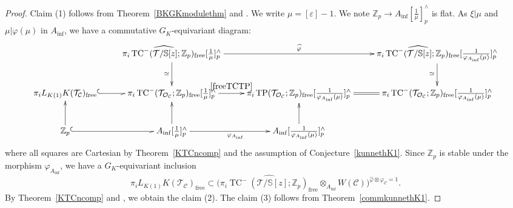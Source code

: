 \documentclass[11pt]{amsart}
\newcommand{\Z}{\mathbb{Z}}
\newcommand{\sO}{\mathcal{O}}
\newcommand{\sT}{\mathcal{T}}
\newcommand{\bS}{\mathbb{S}}
\newcommand{\free}{\operatorname{{free}}}
\newcommand{\LK}{{L_{K(1)}}}
\newcommand{\TP}{\operatorname{TP}}
\newcommand{\TCn}{\operatorname{TC}^{-}}
\renewcommand{\epsilon}{\varepsilon}
\newcommand{\Ainf}{A_{\operatorname{inf}}}
\newcommand{\Cu}{\mathcal{C}}
\theoremstyle{definition}
\theoremstyle{remark}
\numberwithin{equation}{section}
\begin{document}
\begin{proof}
 Claim (1) follows from Theorem~\ref{BKGKmodulethm} and \cite[Theorem 7.1.7]{Gao}. We write $\mu=[\epsilon]-1$. We note $\Z_p \to \Ainf[\frac{1}{\mu}]^{\wedge}_p$ is flat. As $\xi | \mu$ and $\mu|\varphi(\mu)$ in $\Ainf$, we have a commutative $G_K$-equivariant diagram:\footnotesize
 \[
 \xymatrix{
&\widehat{\pi_i\TCn(\sT/\bS[z];\Z_p)_{\free}}[\frac{1}{\mu}]^{\wedge}_p \ar[d]_{\simeq}\ar[rr]^-{\widehat{\varphi}}& &\widehat{\pi_i\TCn(\sT/\bS[z];\Z_p)_{\free}}[\frac{1}{\varphi_{\Ainf}(\mu)}]^{\wedge}_p\ar[d]_{\simeq}\\
 \pi_i\LK K(\sT_\Cu)_{\free}\ar@{^{(}-_>}[r]&\pi_i\TCn(\sT_{\sO_\Cu};\Z_p)_{\free}[\frac{1}{\mu}]^{\wedge}_p \ar[r]^-{\eqref{freeTCTP}}&\pi_i\TP(\sT_{\sO_\Cu};\Z_p)_{\free}[\frac{1}{\varphi_{\Ainf}(\mu)}]^{\wedge}_p\ar@{=}[r]&\pi_i\TCn(\sT_{\sO_\Cu};\Z_p)_{\free}[\frac{1}{\varphi_{\Ainf}(\mu)}]^{\wedge}_p\\
 \Z_p \ar@{^{(}-_>}[r]_{} \ar[u]&\Ainf[\frac{1}{\mu}]^{\wedge}_p\ar[u]\ar[r]_{\varphi_{\Ainf}} & \Ainf[\frac{1}{\varphi_{\Ainf}(\mu)}]^{\wedge}_p\ar[u]&
 }
 \]\normalsize
 where all squares are Cartesian by Theorem~\ref{KTCncomp} and the assumption of Conjecture~\ref{kunnethK1}. Since $\Z_p$ is stable under the morphism $\varphi_{\Ainf}$, we have a $G_K$-equivariant inclusion 
 \[
 \pi_i\LK K(\sT_\Cu)_{\free} \subset \bigl( \widehat{\pi_i\TCn(\sT/\bS[z];\Z_p)_{\free}}\otimes_{\Ainf} W(\Cu) \bigr)^{\widehat{\varphi}\otimes \varphi_{\Cu}=1}.
 \]
By Theorem~\ref{KTCncomp} and \cite[Proposition~7.1.4]{Gao}, we obtain the claim (2). The claim (3) follows from Theorem~\ref{commkunnethK1}. 
\end{proof}





%


%
\end{document}
